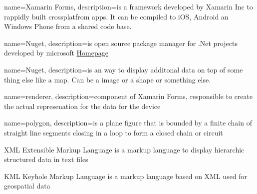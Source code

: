 
{
  name=Xamarin Forms,
  description={is a framework developed by Xamarin Inc to rappidly built crossplatfrom apps. It can be compiled to iOS, Android an Windows Phone from a shared code base.}
}

{
  name=Nuget,
  description={is open source package manager for .Net projects developed by microsoft
  \href{http://nuget.codeplex.com/}{Homepage} }
}

{
  name=Nuget,
  description={is an way to display additonal data on top of some thing else like a map. Can be a image or a shape or something else.}
}

{
  name=renderer,
  description={component of Xamarin Forms, responsible to create the actual represenation for the data for the device}
}

{
  name=polygon,
  description={is a plane figure that is bounded by a finite chain of straight line segments closing in a loop to form a closed chain or circuit}
}

  {XML}            %
  {Extensible Markup Language}  %
  {is a markup language to display hierarchic structured data in text files} %

  {KML}            %
  {Keyhole Markup Language}  %
  {is a markup language based on XML used for geospatial data} %



